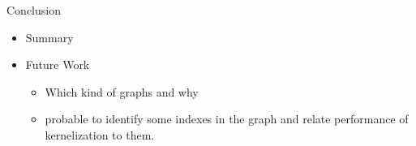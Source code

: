 \documentclass{beamer}
\begin{document}
\begin{frame}{Conclusion}
\begin{itemize}
\item Summary
 
\item Future Work
\begin{itemize}
 
\item Which kind of graphs and why
 
\item probable to identify some indexes in the graph and relate performance of kernelization to them.
\end{itemize}
\end{itemize}

\end{frame}
\end{document}
